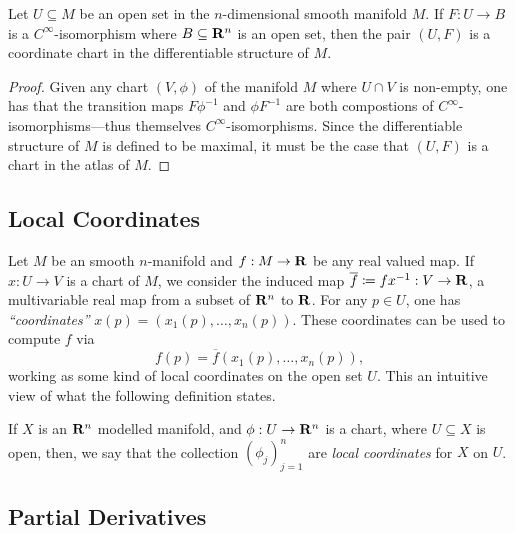 \begin{proposition}
    \label{prop:smooth-maps-are-coordinate-charts}
    Let \(U \subseteq M\) be an open set in the \(n\)-dimensional smooth manifold
    \(M\). If \(F: U \to B\) is a \(C^{\infty}\)-isomorphism where
    \(B \subseteq \mathbf{R}^n\) is an open set, then the pair \((U, F)\) is a coordinate
    chart in the differentiable structure of \(M\).
\end{proposition}

\begin{proof}
    Given any chart \((V, \phi)\) of the manifold \(M\) where \(U \cap V\) is
    non-empty, one has that the transition maps \(F \phi^{-1}\) and \(\phi F^{-1}\)
    are both compostions of \(C^{\infty}\)-isomorphisms---thus themselves
    \(C^{\infty}\)-isomorphisms. Since the differentiable structure of \(M\) is
    defined to be maximal, it must be the case that \((U, F)\) is a chart in the
    atlas of \(M\).
\end{proof}

\subsection{Local Coordinates}

Let \(M\) be an smooth \(n\)-manifold and \(f: M \to \mathbf{R}\) be any real valued
map. If \(x: U \to V\) is a chart of \(M\), we consider the induced map
\(\overline{f} \coloneq f x^{-1}: V \to \mathbf{R}\), a multivariable real map from a
subset of \(\mathbf{R}^n\) to \(\mathbf{R}\). For any \(p \in U\), one has
\emph{``coordinates''} \(x(p) = (x_1(p), \dots, x_n(p))\). These coordinates can
be used to compute \(f\) via
\[
    f(p) = \overline{f}(x_1(p), \dots, x_n(p)),
\]
working as some kind of local coordinates on the open set \(U\). This an
intuitive view of what the following definition states.

\begin{definition}
    \label{def:local-coordinates}
    If \(X\) is an \(\mathbf{R}^n\) modelled manifold, and \(\phi: U \to \mathbf{R}^n\) is a chart,
    where \(U \subseteq X\) is open, then, we say that the collection
    \((\phi_j)_{j=1}^n\) are \emph{local coordinates} for \(X\) on \(U\).
\end{definition}

\subsection{Partial Derivatives}

